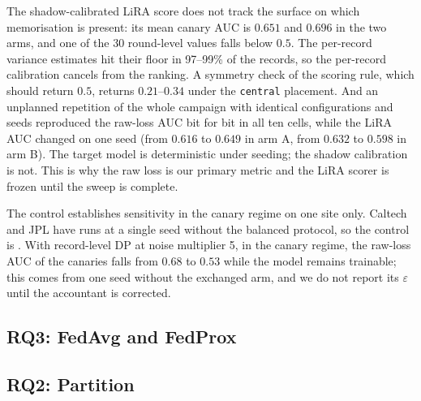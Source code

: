 The shadow-calibrated LiRA score does not track the surface on which
memorisation is present: its mean canary AUC is $0.651$ and $0.696$ in the two
arms, and one of the 30 round-level values falls below $0.5$. The per-record
variance estimates hit their floor in 97--99\% of the records, so the
per-record calibration cancels from the ranking. A symmetry check of the
scoring rule, which should return $0.5$, returns $0.21$--$0.34$ under the
\texttt{central} placement. And an unplanned repetition of the whole campaign
with identical configurations and seeds reproduced the raw-loss AUC bit for bit
in all ten cells, while the LiRA AUC changed on one seed (from $0.616$ to
$0.649$ in arm A, from $0.632$ to $0.598$ in arm B). The target model is
deterministic under seeding; the shadow calibration is not. This is why the
raw loss is our primary metric and the LiRA scorer is frozen until the sweep is
complete.

The control establishes sensitivity in the canary regime on one site only.
Caltech and JPL have runs at a single seed without the balanced protocol, so
the control is . With record-level DP at
noise multiplier 5, in the canary regime, the raw-loss AUC of the canaries falls
from $0.68$ to $0.53$ while the model remains trainable; this comes from one
seed without the exchanged arm, and we do not report its $\varepsilon$ until
the accountant is corrected.

\subsection{RQ3: FedAvg and FedProx}
\label{sec:results-rq3}


\subsection{RQ2: Partition}
\label{sec:results-rq2}


